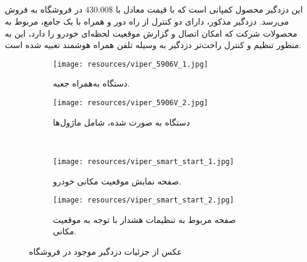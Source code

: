 \documentclass[a4paper,12pt]{report}
\begin{document}
	\subsection{
	}\label{subsec1:sec3:chap1}
	این دزدگیر محصول کمپانی
	است که با قیمت معادل با
	$430.00\$$
	در فروشگاه
		به فروش می‌رسد.
	دزدگیر مذکور، دارای دو کنترل از راه دور و همراه با یک
	جامع، مربوط به محصولات شرکت
		که امکان اتصال و گزارش موقعیت لحظه‌ای خودرو را دارد، این
	به منظور تنظیم و کنترل راحت‌تر دزدگیر به وسیله تلفن همراه هوشمند تعبیه شده است.
	\cite{viperCar35:online}
	\begin{figure}[!h]
		\centering
		\footnotesize
		\begin{subfigure}[t]{0.3\linewidth}
			\centering
			\texttt{[image: resources/viper\_5906V\_1.jpg]}
			\caption{
				دستگاه
				به‌همراه جعبه.
			}
			\label{subfig1:fig1:sec3:chap1}
		\end{subfigure}
		\hspace*{1cm}
		\begin{subfigure}[t]{0.3\linewidth}
			\centering
			\texttt{[image: resources/viper\_5906V\_2.jpg]}
			\caption{
				دستگاه 	به صورت
				شده، شامل ماژول‌ها
			}
			\label{subfig2:fig1:sec3:chap1}
		\end{subfigure}
		\\\vspace*{5mm}%
		\begin{subfigure}[t]{0.3\linewidth}
			\centering
			\texttt{[image: resources/viper\_smart\_start\_1.jpg]}
			\caption{
				صفحه نمایش موقعیت مکانی خودرو.
			}
			\label{subfig3:fig1:sec3:chap1}
		\end{subfigure}
		\hspace*{1cm}
		\begin{subfigure}[t]{0.3\linewidth}
			\centering
			\texttt{[image: resources/viper\_smart\_start\_2.jpg]}
			\caption{
				صفحه مربوط به تنظیمات هشدار با توجه به موقعیت مکانی.
			}
			\label{subfig4:fig1:sec3:chap1}
		\end{subfigure}
		\normalsize
		\caption{
			عکس از جزئیات دزدگیر
			موجود در فروشگاه
			\hyperref{https://www.amazon.com/Viper-5906V-Color-Remote-Security/dp/B00H0874IG}{car alarm unboxed}{Viper 5906V}{}
		}
		\label{fig1:sec3:chap1}
	\end{figure}
\end{document}
